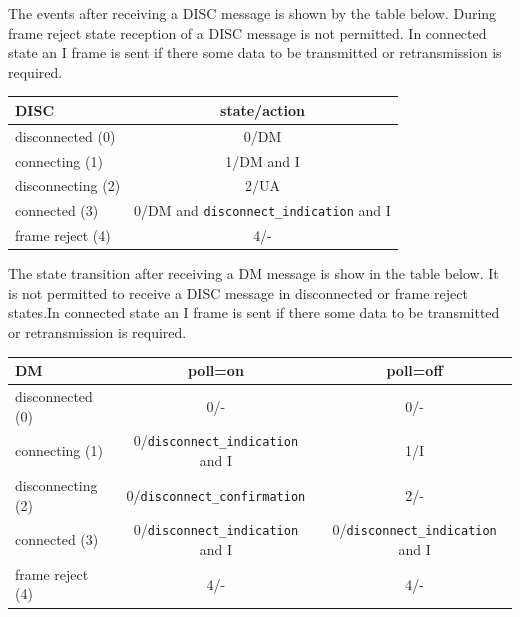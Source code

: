 \documentclass[a4paper]{article}
\begin{document}
The events after receiving a DISC message is shown by the table below. During frame reject state reception of a DISC
message is not permitted. In connected state an I frame is sent if there some data to be transmitted or retransmission
is required.

{\footnotesize
\begin{center}
    \begin{tabular}{|l|c|}
        \hline
        DISC              & state/action                                \\
        \hline
        disconnected (0)  & 0/DM                                        \\
        \hline
        connecting (1)    & 1/DM and I                                  \\
        \hline
        disconnecting (2) & 2/UA                                        \\
        \hline
        connected (3)     & 0/DM and \verb!disconnect_indication! and I  \\
        \hline
        frame reject (4)  & 4/-                                         \\
        \hline
    \end{tabular}
\end{center}
}

The state transition after receiving a DM message is show in the table below. It is not permitted to receive a DISC
message in disconnected or frame reject states.In connected state an I frame is sent if there some data to be
transmitted or retransmission is required.

{\footnotesize
\begin{center}
    \begin{tabular}{|l|c|c|}
        \hline
        DM                & poll=on                             & poll=off                             \\
        \hline
        disconnected (0)  & 0/-                                 & 0/-                                  \\
        \hline
        connecting (1)    & 0/\verb!disconnect_indication! and I & 1/I                                  \\
        \hline
        disconnecting (2) & 0/\verb!disconnect_confirmation!       & 2/-                                  \\
        \hline
        connected (3)     & 0/\verb!disconnect_indication! and I & 0/\verb!disconnect_indication! and I  \\
        \hline
        frame reject (4)  & 4/-                                 & 4/-                                  \\
        \hline
    \end{tabular}
\end{center}
}
\end{document}
